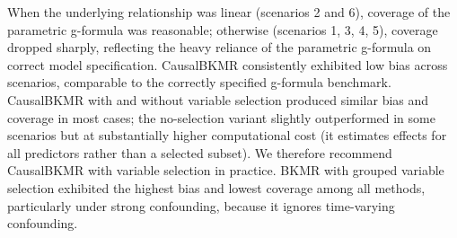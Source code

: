 When the underlying relationship was linear (scenarios 2 and 6), coverage of the parametric g-formula was reasonable; otherwise (scenarios 1, 3, 4, 5), coverage dropped sharply, reflecting the heavy reliance of the parametric g-formula on correct model specification. CausalBKMR consistently exhibited low bias across scenarios, comparable to the correctly specified g-formula benchmark. CausalBKMR with and without variable selection produced similar bias and coverage in most cases; the no-selection variant slightly outperformed in some scenarios but at substantially higher computational cost (it estimates effects for all predictors rather than a selected subset). We therefore recommend CausalBKMR with variable selection in practice. BKMR with grouped variable selection exhibited the highest bias and lowest coverage among all methods, particularly under strong confounding, because it ignores time-varying confounding.

